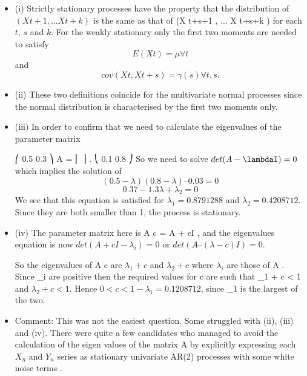 \documentclass[a4paper,12pt]{article}
\begin{document}
\begin{itemize}
\item (i)
Strictly stationary processes have the property that the distribution of $(X t+1 , ... X t+k )$ is the same as that of (X t+s+1 , ... X t+s+k ) for each $t$, $s$ and $k$. For the weakly stationary only the first two moments are needed to satisfy
\[E (X t ) = \mu ∀t\]
and
\[cov(X t , X t+s ) = γ(s)
∀t, s.\]
\item (ii) These two definitions coincide for the multivariate normal processes since the normal distribution is characterised by the first two moments only.

\item 
(iii) In order to confirm that we need to calculate the eigenvalues of the parameter
matrix



⎛ 0.5 0.3 ⎞
A = ⎜
⎟ .
⎝ 0.1 0.8 ⎠
So we need to solve $det(A - \lambdaI) = 0$ which implies the solution of
\[(0.5 - \lambda) (0.8 - \lambda) – 0.03 = 0\]
\[0.37 − 1.3\lambda + \lambda_{2} = 0\]
We see that this equation is satisfied for $\lambda_{1} = 0.8791288$ and $\lambda_{2} = 0.4208712$.
Since they are both smaller than 1, the process is stationary.
\item (iv)
The parameter matrix here is A c = A + cI , and the eigenvalues equation is now $det( A + cI - \lambda_{i} ) = 0$ or $det( A – (\lambda - c ) I ) = 0$.

So the eigenvalues of A c are $\lambda_{1} + c$ and $\lambda_{2} + c$ where $\lambda_{i}$ are those of A .
Since \lambda_{i} are positive then the required values for c are such that \lambda_{1} + c < 1 and $\lambda_{2} + c < 1$.
Hence $0 < c < 1 - \lambda_{1} = 0.1208712$, since \lambda_{1} is the largest of the two.

\item Comment: This was not the easiest question. Some struggled with (ii), (iii) and (iv).
There were quite a few candidates who managed to avoid the calculation of the eigen values of the matrix A by explicitly expressing each $X_n$ and $Y_n$ series as stationary univariate AR(2) processes with some white noise terms .
\end{itemize}
\end{document}

